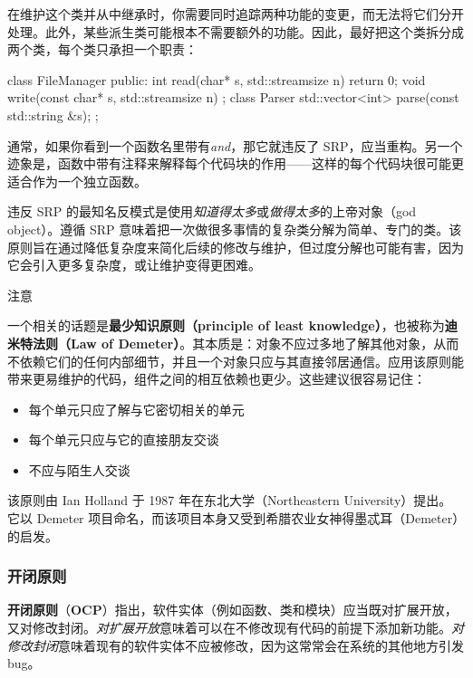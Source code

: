 在维护这个类并从中继承时，你需要同时追踪两种功能的变更，而无法将它们分开处理。此外，某些派生类可能根本不需要额外的功能。因此，最好把这个类拆分成两个类，每个类只承担一个职责：

\begin{codebox}[cpp]
class FileManager {
public:
    int read(char* s, std::streamsize n) { return 0; }
    void write(const char* s, std::streamsize n) {}
};
class Parser {
    std::vector<int> parse(const std::string &s);
};
\end{codebox}

通常，如果你看到一个函数名里带有\emph{and}，那它就违反了 SRP，应当重构。另一个迹象是，函数中带有注释来解释每个代码块的作用——这样的每个代码块很可能更适合作为一个独立函数。

\label{idx:036}
\label{idx:037}
违反 SRP 的最知名反模式是使用\emph{知道得太多}或\emph{做得太多}的上帝对象（god object）。遵循 SRP 意味着把一次做很多事情的复杂类分解为简单、专门的类。该原则旨在通过降低复杂度来简化后续的修改与维护，但过度分解也可能有害，因为它会引入更多复杂度，或让维护变得更困难。

\begin{myNotic}{注意}

\label{idx:038}
\label{idx:039}
一个相关的话题是\textbf{最少知识原则（principle of least knowledge）}，也被称为\textbf{迪米特法则（Law of Demeter）}。其本质是：对象不应过多地了解其他对象，从而不依赖它们的任何内部细节，并且一个对象只应与其直接邻居通信。应用该原则能带来更易维护的代码，组件之间的相互依赖也更少。这些建议很容易记住：

\begin{itemize}
\item 每个单元只应了解与它密切相关的单元
\item 每个单元只应与它的直接朋友交谈
\item 不应与陌生人交谈
\end{itemize}

该原则由 Ian Holland 于 1987 年在东北大学（Northeastern University）提出。它以 Demeter 项目命名，而该项目本身又受到希腊农业女神得墨忒耳（Demeter）的启发。
\end{myNotic}

\subsubsection{开闭原则}

\label{idx:040}
\label{idx:041}
\textbf{开闭原则}（\textbf{OCP}）指出，软件实体（例如函数、类和模块）应当既对扩展开放，又对修改封闭。\emph{对扩展开放}意味着可以在不修改现有代码的前提下添加新功能。\emph{对修改封闭}意味着现有的软件实体不应被修改，因为这常常会在系统的其他地方引发 bug。


